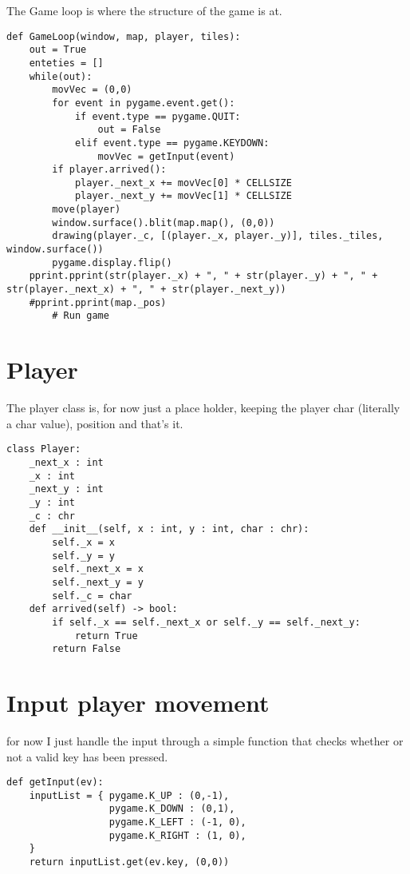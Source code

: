 \documentclass[11pt]{article}
\begin{document}
The Game loop is where the structure of the game is at.

\begin{verbatim}
def GameLoop(window, map, player, tiles):
    out = True
    enteties = []
    while(out):
        movVec = (0,0)
        for event in pygame.event.get():
            if event.type == pygame.QUIT:
                out = False
            elif event.type == pygame.KEYDOWN:
                movVec = getInput(event)
        if player.arrived():
            player._next_x += movVec[0] * CELLSIZE
            player._next_y += movVec[1] * CELLSIZE
        move(player)
        window.surface().blit(map.map(), (0,0))
        drawing(player._c, [(player._x, player._y)], tiles._tiles, window.surface())
        pygame.display.flip()
    pprint.pprint(str(player._x) + ", " + str(player._y) + ", " + str(player._next_x) + ", " + str(player._next_y))
    #pprint.pprint(map._pos)
        # Run game
\end{verbatim}

\section{Player}
\label{sec:org4c9a2f6}

The player class is, for now just a place holder, keeping the player char (literally a char value), position and that's it.

\begin{verbatim}
class Player:
    _next_x : int
    _x : int
    _next_y : int
    _y : int
    _c : chr
    def __init__(self, x : int, y : int, char : chr):
        self._x = x
        self._y = y
        self._next_x = x
        self._next_y = y
        self._c = char
    def arrived(self) -> bool:
        if self._x == self._next_x or self._y == self._next_y:
            return True
        return False
\end{verbatim}

\section{Input player movement}
\label{sec:org3511d29}

for now I just handle the input through a simple function that checks whether or not a valid key has been pressed.

\begin{verbatim}
def getInput(ev):
    inputList = { pygame.K_UP : (0,-1),
                  pygame.K_DOWN : (0,1),
                  pygame.K_LEFT : (-1, 0),
                  pygame.K_RIGHT : (1, 0),
    }
    return inputList.get(ev.key, (0,0))
\end{verbatim}
\end{document}
